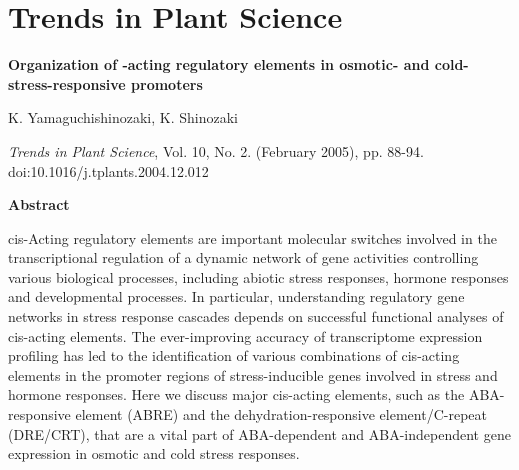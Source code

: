 \chapter{Trends in Plant Science}


{\Large \bf Organization of -acting regulatory elements in osmotic- and cold-stress-responsive promoters}

K. Yamaguchishinozaki, K. Shinozaki

{\it Trends in Plant Science}, Vol. 10, No. 2. (February 2005), pp. 88-94. doi:10.1016/j.tplants.2004.12.012

{\large \bf Abstract}

cis-Acting regulatory elements are important molecular switches involved in the transcriptional regulation of a dynamic network of gene activities controlling various biological processes, including abiotic stress responses, hormone responses and developmental processes. In particular, understanding regulatory gene networks in stress response cascades depends on successful functional analyses of cis-acting elements. The ever-improving accuracy of transcriptome expression profiling has led to the identification of various combinations of cis-acting elements in the promoter regions of stress-inducible genes involved in stress and hormone responses. Here we discuss major cis-acting elements, such as the ABA-responsive element (ABRE) and the dehydration-responsive element/C-repeat (DRE/CRT), that are a vital part of ABA-dependent and ABA-independent gene expression in osmotic and cold stress responses. 
